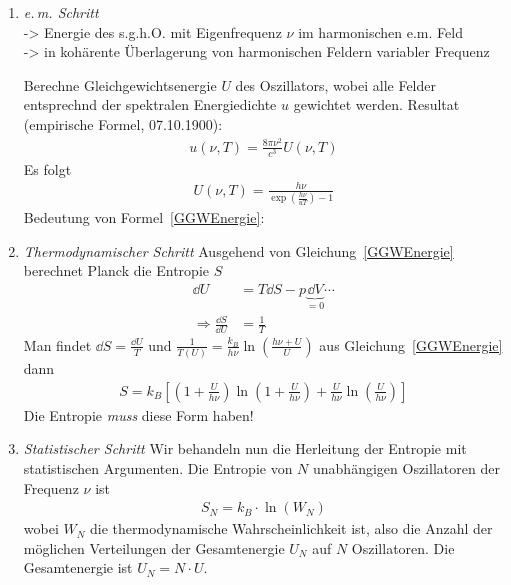 \begin{enumerate}
\item  \emph{e.\,m. Schritt}\\
  -> Energie des s.g.h.O. mit Eigenfrequenz $\nu$ im harmonischen
  e.m. Feld\\
  -> in kohärente Überlagerung von harmonischen Feldern variabler
  Frequenz

Berechne Gleichgewichtsenergie $U$ des Oszillators, wobei alle Felder
entsprechnd der spektralen Energiedichte $u$ gewichtet werden.
Resultat (empirische Formel, 07.10.1900):
\begin{gather*}
  u(\nu, T) = \frac{8\pi\nu^2}{c^3} U(\nu, T)
\end{gather*}
Es folgt
\begin{gather}
  U(\nu, T) = \frac{h\nu}{\exp(\frac{h\nu}{uT}) - 1}
  \label{GGWEnergie}
\end{gather}
Bedeutung von Formel~\eqref{GGWEnergie}:

\item \emph{Thermodynamischer Schritt}
Ausgehend von Gleichung~\eqref{GGWEnergie} berechnet Planck die
Entropie $S$
\begin{align*}
  \dd U &= T\dd S - p\underbrace{\dd V}_{=0} \dotsb \\
  \Rightarrow \frac{\dd S}{\dd U} &= \frac{1}{T}
\end{align*}
Man findet 
$\dd S = \frac{\dd U}{T}$ und 
$\frac{1}{T(U)} = \frac{k_B}{h\nu} \ln\left(\frac{h\nu+U}{U}\right)$
aus Gleichung~\eqref{GGWEnergie} dann
\begin{gather*}
  S = k_B \left[ 
    \left(1+\frac{U}{h\nu}\right) \ln\left(1+\frac{U}{h\nu}\right)
    + \frac{U}{h\nu}\ln\left(\frac{U}{h\nu}\right)
  \right]
\end{gather*}
Die Entropie \emph{muss} diese Form haben!

\item \emph{Statistischer Schritt}
  Wir behandeln nun die Herleitung der Entropie mit statistischen
  Argumenten.
  Die Entropie von $N$ unabhängigen Oszillatoren der Frequenz $\nu$
  ist
  \begin{gather*}
    S_N = k_B\cdot \ln(W_N)
  \end{gather*}
  wobei $W_N$
  die thermodynamische Wahrscheinlichkeit ist, also die Anzahl der
  möglichen Verteilungen der Gesamtenergie $U_N$ auf $N$ Oszillatoren.
  Die Gesamtenergie ist $U_N=N\cdot
  U$.


\end{enumerate}
